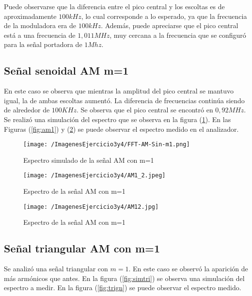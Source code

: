 Puede observarse que la diferencia entre el pico central y los escoltas es de aproximadamente $100 kHz$, lo cual corresponde a lo esperado, ya que la frecuencia de la moduladora era de $100 kHz$. Además, puede apreciarse que el pico central está a una frecuencia de $1,011 MHz$, muy cercana a la frecuencia que se configuró para la señal portadora de $1 Mhz$.

\subsection{Señal senoidal AM m=1}

En este caso se observa que mientras la amplitud del pico central se mantuvo igual, la de ambas escoltas aumentó. La diferencia de frecuencias continúa siendo de alrededor de $100 KHz$. Se observa que el pico central se encontró en $0,92 MHz$. Se realizó una simulación del espectro que se observa en la figura (\ref{fig:simsin}). En las Figuras (\ref{fig:am1}) y (\ref{fig:am2}) se puede observar el espectro medido en el analizador.

\begin{figure}[H]
	\centering
	\texttt{[image: /ImagenesEjercicio3y4/FFT-AM-Sin-m1.png]}
\caption{Espectro simulado de la señal AM con m=1}
	\label{fig:simsin}
\end{figure}

\begin{figure}[H]
  \centering
  \begin{minipage}[b]{0.6\textwidth}
    \texttt{[image: /ImagenesEjercicio3y4/AM1\_2.jpeg]}
    \caption{Espectro de la señal AM con m=1}
    \label{fig:am1}
  \end{minipage}
  \hfill
  \begin{minipage}[b]{0.6\textwidth}
    \texttt{[image: /ImagenesEjercicio3y4/AM12.jpg]}
    \caption{Espectro de la señal AM con m=1}
    \label{fig:am2}
  \end{minipage}
\end{figure}

\subsection{Señal triangular AM con m=1}
Se analizó una señal triangular con $m=1$. En este caso se observó la aparición de más armónicos que antes. En la figura (\ref{fig:simtri}) se observa una simulación del espectro a medir. En la figura (\ref{fig:trign}) se puede observar el espectro medido.


